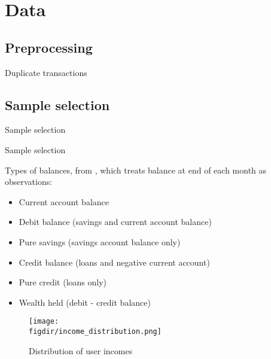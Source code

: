 
\section{Data}%
\label{sec:data}

\subsection{Preprocessing}%
\label{sub:preprocessing}

Duplicate transactions


\subsection{Sample selection}%
\label{sub:sample_selection}


\begin{table}[ht]
\caption{Sample selection}\label{tab:selection}

\end{table}


\begin{table}[ht]
\caption{Sample selection}\label{tab:selection}

\end{table}


Types of balances, from \citet{becker2017does}, which treats balance at end of
each month as observations:

\begin{itemize}
    \item Current account balance
    \item Debit balance (savings and current account balance)
    \item Pure savings (savings account balance only)
    \item Credit balance (loans and negative current account)
    \item Pure credit (loans only)
    \item Wealth held (debit - credit balance)
\end{itemize}


\begin{figure}[h]\center
    \caption{Distribution of user incomes}    
    \label{fig:income_distr}
    \texttt{[image: \\figdir/income\_distribution.png]}
\end{figure}

